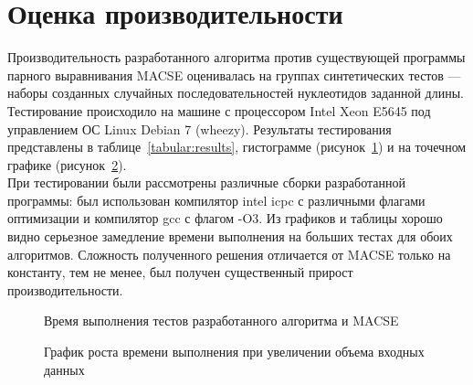 \clearpage
\newpage

\section[Оценка производительности]{\large \centering Оценка производительности}
\hspace{\parindent} Производительность разработанного алгоритма против существующей программы парного выравнивания MACSE оценивалась на группах синтетических тестов --- наборы созданных случайных последовательностей нуклеотидов заданной длины. Тестирование происходило на машине с процессором Intel Xeon E5645 под управлением ОС Linux Debian 7 (wheezy). Результаты тестирования представлены в таблице~\ref{tabular:results}, гистограмме (рисунок~\ref{ris:gist}) и на точечном графике (рисунок~\ref{ris:3D}).\\
\indent При тестировании были рассмотрены различные сборки разработанной программы: был использован компилятор intel icpc с различными флагами оптимизации и компилятор gcc с флагом -O3. Из графиков и таблицы хорошо видно серьезное замедление времени выполнения на больших тестах для обоих алгоритмов. Сложность полученного решения отличается от MACSE только на константу, тем не менее, был получен существенный прирост производительности.

\begin{figure}[h]
	\caption{Время выполнения тестов разработанного алгоритма и MACSE}
	\label{ris:gist}
\end{figure}
\begin{figure}[h]
	\caption{График роста времени выполнения при увеличении объема входных данных}
	\label{ris:3D}
\end{figure}

